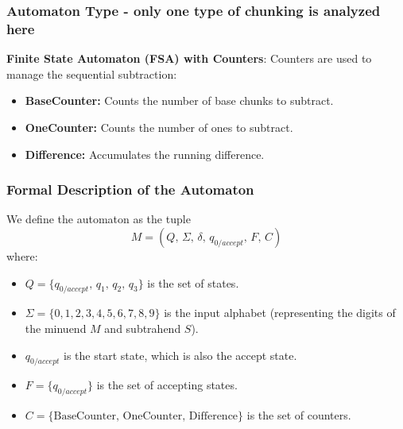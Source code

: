 \documentclass[11pt]{article}
\begin{document}
\subsubsection*{Automaton Type - only one type of chunking is analyzed here}
\textbf{Finite State Automaton (FSA) with Counters}:  
Counters are used to manage the sequential subtraction:
\begin{itemize}
    \item \textbf{BaseCounter:} Counts the number of base chunks to subtract.
    \item \textbf{OneCounter:} Counts the number of ones to subtract.
    \item \textbf{Difference:} Accumulates the running difference.
\end{itemize}

\subsubsection*{Formal Description of the Automaton}

We define the automaton as the tuple
\[
M = (Q,\, \Sigma,\, \delta,\, q_{0/accept},\, F,\, C)
\]
where:
\begin{itemize}
    \item \(Q = \{q_{0/accept},\, q_1,\, q_2,\, q_3\}\) is the set of states.
    \item \(\Sigma = \{0,1,2,3,4,5,6,7,8,9\}\) is the input alphabet (representing the digits of the minuend \(M\) and subtrahend \(S\)).
    \item \(q_{0/accept}\) is the start state, which is also the accept state.
    \item \(F = \{q_{0/accept}\}\) is the set of accepting states.
    \item \(C = \{\text{BaseCounter},\, \text{OneCounter},\, \text{Difference}\}\) is the set of counters.
\end{itemize}
\end{document}
